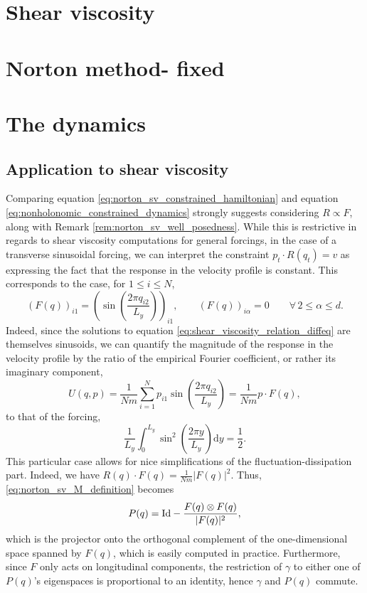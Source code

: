 \section{Shear viscosity}

\section{Norton method- fixed}
\section{The dynamics}


\subsection{Application to shear viscosity}
Comparing equation \eqref{eq:norton_sv_constrained_hamiltonian} and equation \eqref{eq:nonholonomic_constrained_dynamics} strongly suggests considering $R\propto F$, along with Remark \ref{rem:norton_sv_well_posedness}.
While this is restrictive in regards to shear viscosity computations for general forcings, in the case of a transverse sinusoidal forcing, we can interpret the constraint $p_t\cdot R(q_t)=v$ as expressing the fact that the response in the velocity profile is constant.
This corresponds to the case, for $1\leq i\leq N$,
\[ \left(F(q)\right)_{i1}=\left(\sin\left(\frac{2\pi q_{i2}}{L_y}\right)\right)_{i1},\qquad \left(F(q)\right)_{i\alpha}=0\qquad\forall\,2\leq\alpha\leq d.\]
Indeed, since the solutions to equation \eqref{eq:shear_viscosity_relation_diffeq} are themselves sinusoids, we can quantify the magnitude of the response in the velocity profile by the ratio of the empirical Fourier coefficient, or rather its imaginary component,
\begin{equation}
    \label{eq:norton_sv_fourier_coeff}
    U(q,p)=\frac{1}{Nm}\sum_{i=1}^Np_{i1}\sin\left(\frac{2\pi q_{i2}}{L_y}\right)=\frac1{Nm}p\cdot F(q),
\end{equation}
to that of the forcing,
\[\frac1{L_y}\int_0^{L_y}\sin^2\left(\frac{2\pi y}{L_y}\right)\mathrm dy=\frac12.\]
This particular case allows for nice simplifications of the fluctuation-dissipation part. Indeed, we have $R(q)\cdot F(q)=\frac{1}{Nm}|F(q)|^2$.
Thus, \eqref{eq:norton_sv_M_definition} becomes
\[P(q)=\mathrm{Id}-\frac{F(q)\otimes F(q)}{|F(q)|^2},\]
which is the projector onto the orthogonal complement of the one-dimensional space spanned by $F(q)$, which is easily computed in practice. Furthermore, since $F$ only acts on longitudinal components, the restriction of $\gamma$ to either one of $P(q)$'s eigenspaces is proportional to an identity, hence $\gamma$ and $P(q)$ commute.
